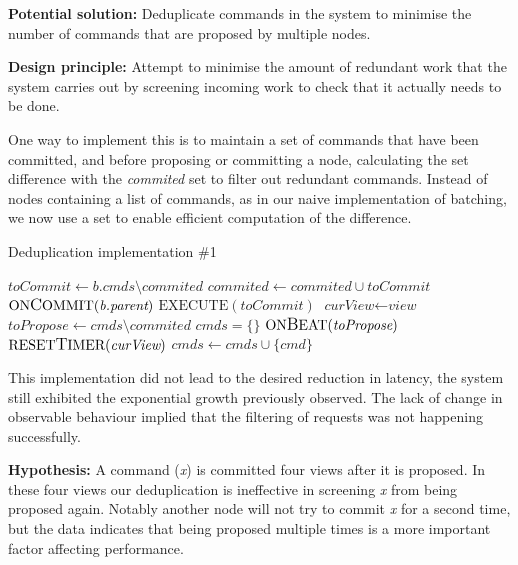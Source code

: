 \textbf{Potential solution: } Deduplicate commands in the system to minimise the number of commands that are proposed by multiple nodes.

\textbf{Design principle: } Attempt to minimise the amount of redundant work that the system carries out by screening incoming work to check that it actually needs to be done.

One way to implement this is to maintain a set of commands that have been committed, and before proposing or committing a node, calculating the set difference with the \textit{commited} set to filter out redundant commands. Instead of nodes containing a list of commands, as in our naive implementation of batching, we now use a set to enable efficient computation of the difference.

\begin{algorithm}[h!]
	\caption{Deduplication implementation \#1}
	\begin{algorithmic}[1]
			\State $\textit{toCommit} \gets \textit{b.cmds} \setminus \textit{commited} $
			\State $\textit{commited} \gets \textit{commited} \cup \textit{toCommit}$
			\State $\text{ON{\large C}OMMIT}(\textit{b.parent})$
			\State $\text{EXECUTE}(\textit{toCommit})$
		\EndIf
	\EndProcedure
		\State $ \textit{curView} \gets \textit{view}$
		\State $ \textit{toPropose} \gets \textit{cmds} \setminus \textit{commited}$
		\State $ \textit{cmds} = \{\}$
		\State $ \text{ON{\large B}EAT}(\textit{toPropose})$
		\State $ \text{RESET{\large T}IMER}(\textit{curView})$
	\EndProcedure
		\State $ \textit{cmds} \gets \textit{cmds} \cup \{\textit{cmd}\} $
	\EndProcedure
	\end{algorithmic}
\end{algorithm}

This implementation did not lead to the desired reduction in latency, the system still exhibited the exponential growth previously observed. The lack of change in observable behaviour implied that the filtering of requests was not happening successfully.

\textbf{Hypothesis: } A command (\textit{x}) is committed four views after it is proposed. In these four views our deduplication is ineffective in screening \textit{x} from being proposed again. Notably another node will not try to commit \textit{x} for a second time, but the data indicates that being proposed multiple times is a more important factor affecting performance. 

